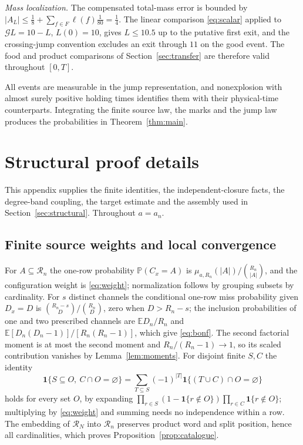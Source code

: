 \documentclass[11pt,letterpaper]{article}
\theoremstyle{plain}
\theoremstyle{definition}
\theoremstyle{remark}
\numberwithin{equation}{section}
\newcommand{\PP}{\mathbb P}
\newcommand{\EE}{\mathbb E}
\newcommand{\RR}{\mathcal R}
\newcommand{\cG}{\mathcal G}
\newcommand{\ind}{\mathbf 1}
\begin{document}
\emph{Mass localization.} The compensated total-mass error is bounded by $|A_L|\le\frac18+\sum_{f\in F}\ell(f)\frac1{80}=\frac14$. The linear comparison \eqref{eq:scalar} applied to $\cG L=10-L$, $L(0)=10$, gives $L\le10.5$ up to the putative first exit, and the crossing-jump convention excludes an exit through $11$ on the good event. The food and product comparisons of Section~\ref{sec:transfer} are therefore valid throughout $[0,T]$.

All events are measurable in the jump representation, and nonexplosion with almost surely positive holding times identifies them with their physical-time counterparts. Integrating the finite source law, the marks and the jump law produces the probabilities in Theorem~\ref{thm:main}.

\section{Structural proof details}\label{app:structural}
This appendix supplies the finite identities, the independent-closure facts, the degree-band coupling, the target estimate and the assembly used in Section~\ref{sec:structural}. Throughout $a=a_n$.

\subsection{Finite source weights and local convergence}\label{app:finite}
For $A\subseteq\RR_n$ the one-row probability $\PP(C_x=A)$ is $\mu_{a,R_n}(|A|)/\binom{R_n}{|A|}$, and the configuration weight is \eqref{eq:weight}; normalization follows by grouping subsets by cardinality. For $s$ distinct channels the conditional one-row miss probability given $D_x=D$ is $\binom{R_n-s}{D}/\binom{R_n}{D}$, zero when $D>R_n-s$; the inclusion probabilities of one and two prescribed channels are $\EE D_n/R_n$ and $\EE[D_n(D_n-1)]/[R_n(R_n-1)]$, which give \eqref{eq:bonf}. The second factorial moment is at most the second moment and $R_n/(R_n-1)\to1$, so its scaled contribution vanishes by Lemma~\ref{lem:moments}. For disjoint finite $S,C$ the identity
\[
 \ind\{S\subseteq O,\ C\cap O=\varnothing\}=\sum_{T\subseteq S}(-1)^{|T|}\ind\{(T\cup C)\cap O=\varnothing\}
\]
holds for every set $O$, by expanding $\prod_{r\in S}(1-\ind\{r\notin O\})\prod_{r\in C}\ind\{r\notin O\}$; multiplying by \eqref{eq:weight} and summing needs no independence within a row. The embedding of $\RR_N$ into $\RR_n$ preserves product word and split position, hence all cardinalities, which proves Proposition~\ref{prop:catalogue}.
\end{document}
